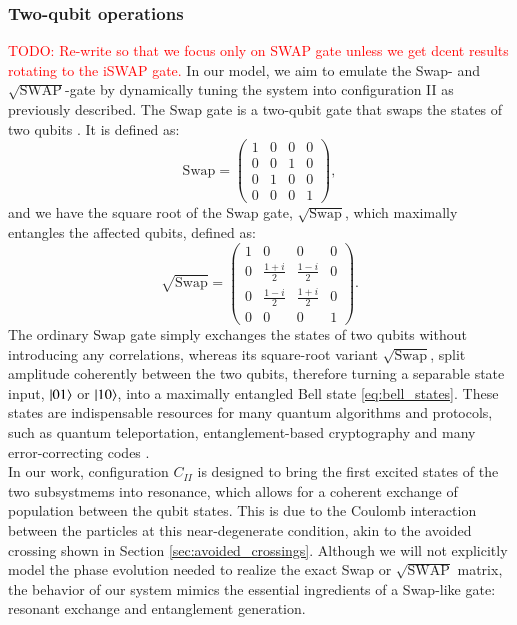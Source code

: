\documentclass{subfiles}
\begin{document}
\subsubsection*{Two-qubit operations}
\textcolor{red}{TODO: Re-write so that we focus only on SWAP gate unless we get dcent results rotating to the iSWAP gate.}
In our model, we aim to emulate the Swap- and $\sqrt{\text{SWAP}}$-gate by dynamically tuning the system into configuration II as previously described. The Swap gate is a two-qubit gate that swaps the states of two qubits \cite{nielsen2010quantum}. It is defined as:
\begin{equation}
    \text{Swap} = \begin{pmatrix}
    1 & 0 & 0 & 0 \\
    0 & 0 & 1 & 0 \\
    0 & 1 & 0 & 0 \\
    0 & 0 & 0 & 1
    \end{pmatrix} \label{eq:swap_gate},
\end{equation}
and we have the square root of the Swap gate, $\sqrt{\text{Swap}}$, which maximally entangles the affected qubits, defined as:
\begin{equation}
    \sqrt{\text{Swap}} = \begin{pmatrix}
    1 & 0 & 0 & 0 \\
    0 & \frac{1+i}{2} & \frac{1-i}{2} & 0 \\
    0 & \frac{1-i}{2} & \frac{1+i}{2} & 0 \\
    0 & 0 & 0 & 1
    \end{pmatrix} \label{eq:sqrt_swap_gate}.
\end{equation}
The ordinary Swap gate simply exchanges the states of two qubits without introducing any correlations, whereas its square-root variant $\sqrt{\text{Swap}}$, split amplitude coherently between the two qubits, therefore turning a separable state input, $\ket{01}$ or $\ket{10}$, into a maximally entangled Bell state \eqref{eq:bell_states}. These states are indispensable resources for many quantum algorithms and protocols, such as quantum teleportation, entanglement-based cryptography and many error-correcting codes \cite{nielsen2010quantum, bouwmeester1997experimental, yin2020entanglement}. 
\\
In our work, configuration $C_{II}$ is designed to bring the first excited states of the two subsystmems into resonance, which allows for a coherent exchange of population between the qubit states. This is due to the Coulomb interaction between the particles at this near-degenerate condition, akin to the avoided crossing shown in Section \ref{sec:avoided_crossings}. Although we will not explicitly model the phase evolution needed to realize the exact Swap or $\sqrt{\text{SWAP}}$ matrix, the behavior of our system mimics the essential ingredients of a Swap-like gate: resonant exchange and entanglement generation. \\
\end{document}
